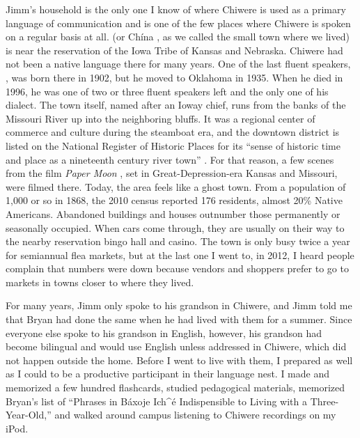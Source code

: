 \documentclass[output=paper]{LSP/langsci}
\begin{document}
Jimm's household is the only one I know of where Chiwere is used as a primary language of communication and is one of the few places where Chiwere is spoken on a regular basis at all.  (or Chína , as we called the small town where we lived) is near the reservation of the Iowa Tribe of Kansas and Nebraska. Chiwere had not been a native language there for many years. One of the last fluent speakers, , was born there in 1902, but he moved to Oklahoma in 1935. When he died in 1996, he was one of two or three fluent speakers left and the only one of his dialect. The town itself, named after an Ioway chief, runs from the banks of the Missouri River up into the neighboring bluffs. It was a regional center of commerce and culture during the steamboat era, and the downtown district is listed on the National Register of Historic Places for its ``sense of historic time and place as a nineteenth century river town'' \citep[1]{Wolfenbarger1996}. For that reason, a few scenes from the film \emph{Paper Moon} \citep{Bogdanovich1973}, set in Great-Depression-era Kansas and Missouri, were filmed there. Today, the area feels like a ghost town. From a population of 1,000 or so in 1868, the 2010 census reported 176 residents, almost 20\% Native Americans. Abandoned buildings and houses outnumber those permanently or seasonally occupied. When cars come through, they are usually on their way to the nearby reservation bingo hall and casino. The town is only busy twice a year for semiannual flea markets, but at the last one I went to, in 2012, I heard people complain that numbers were down because vendors and shoppers prefer to go to markets in towns closer to where they lived.

For many years, Jimm only spoke to his grandson in Chiwere, and Jimm told me that Bryan had done the same when he had lived with them for a summer. Since everyone else spoke to his grandson in English, however, his grandson had become bilingual and would use English unless addressed in Chiwere, which did not happen outside the home. Before I went to live with them, I prepared as well as I could to be a productive participant in their language nest. I made and memorized a few hundred flashcards, studied pedagogical materials, memorized Bryan's list of ``Phrases in Báxoje Ich\^{ }é Indispensible to Living with a Three-Year-Old,'' and walked around campus listening to Chiwere recordings on my iPod.
\end{document}
